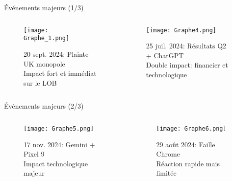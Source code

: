 \documentclass[aspectratio=169]{beamer}  %
\begin{document}
\begin{frame}{Événements majeurs (1/3)}
    \begin{columns}
        \begin{column}{0.48\textwidth}
            \begin{figure}
                \centering
                \texttt{[image: Graphe\_1.png]}
                \caption{20 sept. 2024: Plainte UK monopole\\
                Impact fort et immédiat sur le LOB}
            \end{figure}
        \end{column}
        \begin{column}{0.48\textwidth}
            \begin{figure}
                \centering
                \texttt{[image: Graphe4.png]}
                \caption{25 juil. 2024: Résultats Q2 + ChatGPT\\
                Double impact: financier et technologique}
            \end{figure}
        \end{column}
    \end{columns}
\end{frame}

\begin{frame}{Événements majeurs (2/3)}
    \begin{columns}
        \begin{column}{0.48\textwidth}
            \begin{figure}
                \centering
                \texttt{[image: Graphe5.png]}
                \caption{17 nov. 2024: Gemini + Pixel 9\\
                Impact technologique majeur}
            \end{figure}
        \end{column}
        \begin{column}{0.48\textwidth}
            \begin{figure}
                \centering
                \texttt{[image: Graphe6.png]}
                \caption{29 août 2024: Faille Chrome\\
                Réaction rapide mais limitée}
            \end{figure}
        \end{column}
    \end{columns}
\end{frame}
\end{document}
